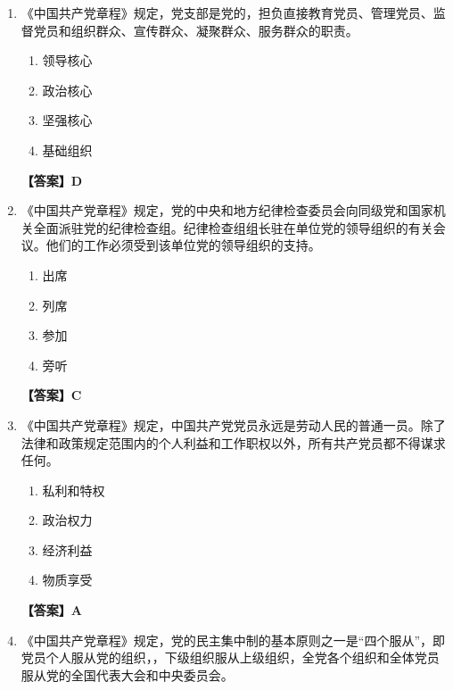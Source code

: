 \documentclass[UTF8,11pt,a4paper]{ctexart}
\begin{document}
\begin{enumerate}[label=\textbf{\arabic*.}, leftmargin=2.5em, itemsep=0.7em]
\begin{enumerate}[label=\Alph*., leftmargin=2em, itemsep=0.1em, topsep=0.15em]
\item 纲领和章程
\item 行动纲领
\end{enumerate}
\textbf{【答案】C}
\item 《中国共产党章程》规定，党支部是党的\allowbreak\underline{\hspace{4em}}，担负直接教育党员、管理党员、监督党员和组织群众、宣传群众、凝聚群众、服务群众的职责。
\begin{enumerate}[label=\Alph*., leftmargin=2em, itemsep=0.1em, topsep=0.15em]
\item 领导核心
\item 政治核心
\item 坚强核心
\item 基础组织
\end{enumerate}
\textbf{【答案】D}
\item 《中国共产党章程》规定，党的中央和地方纪律检查委员会向同级党和国家机关全面派驻党的纪律检查组。纪律检查组组长\allowbreak\underline{\hspace{4em}}驻在单位党的领导组织的有关会议。他们的工作必须受到该单位党的领导组织的支持。
\begin{enumerate}[label=\Alph*., leftmargin=2em, itemsep=0.1em, topsep=0.15em]
\item 出席
\item 列席
\item 参加
\item 旁听
\end{enumerate}
\textbf{【答案】C}
\item 《中国共产党章程》规定，中国共产党党员永远是劳动人民的普通一员。除了法律和政策规定范围内的个人利益和工作职权以外，所有共产党员都不得谋求任何\allowbreak\underline{\hspace{4em}}。
\begin{enumerate}[label=\Alph*., leftmargin=2em, itemsep=0.1em, topsep=0.15em]
\item 私利和特权
\item 政治权力
\item 经济利益
\item 物质享受
\end{enumerate}
\textbf{【答案】A}
\item 《中国共产党章程》规定，党的民主集中制的基本原则之一是“四个服从”，即党员个人服从党的组织，\allowbreak\underline{\hspace{4em}}，下级组织服从上级组织，全党各个组织和全体党员服从党的全国代表大会和中央委员会。
\begin{enumerate}[label=\Alph*., leftmargin=2em, itemsep=0.1em, topsep=0.15em]

\end{enumerate}
\end{enumerate}
\end{document}
